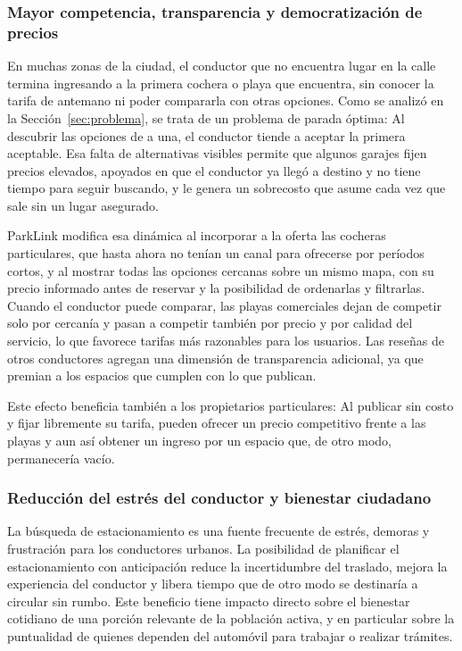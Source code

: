 \subsubsection{Mayor competencia, transparencia y democratización de precios}

En muchas zonas de la ciudad, el conductor que no encuentra lugar en la calle termina ingresando a la primera cochera o playa que encuentra, sin conocer la tarifa de antemano ni poder compararla con otras opciones. Como se analizó en la Sección~\ref{sec:problema}, se trata de un problema de parada óptima: Al descubrir las opciones de a una, el conductor tiende a aceptar la primera aceptable. Esa falta de alternativas visibles permite que algunos garajes fijen precios elevados, apoyados en que el conductor ya llegó a destino y no tiene tiempo para seguir buscando, y le genera un sobrecosto que asume cada vez que sale sin un lugar asegurado.

ParkLink modifica esa dinámica al incorporar a la oferta las cocheras particulares, que hasta ahora no tenían un canal para ofrecerse por períodos cortos, y al mostrar todas las opciones cercanas sobre un mismo mapa, con su precio informado antes de reservar y la posibilidad de ordenarlas y filtrarlas. Cuando el conductor puede comparar, las playas comerciales dejan de competir solo por cercanía y pasan a competir también por precio y por calidad del servicio, lo que favorece tarifas más razonables para los usuarios. Las reseñas de otros conductores agregan una dimensión de transparencia adicional, ya que premian a los espacios que cumplen con lo que publican.

Este efecto beneficia también a los propietarios particulares: Al publicar sin costo y fijar libremente su tarifa, pueden ofrecer un precio competitivo frente a las playas y aun así obtener un ingreso por un espacio que, de otro modo, permanecería vacío.

\subsubsection{Reducción del estrés del conductor y bienestar ciudadano}

La búsqueda de estacionamiento es una fuente frecuente de estrés, demoras y frustración para los conductores urbanos. La posibilidad de planificar el estacionamiento con anticipación reduce la incertidumbre del traslado, mejora la experiencia del conductor y libera tiempo que de otro modo se destinaría a circular sin rumbo. Este beneficio tiene impacto directo sobre el bienestar cotidiano de una porción relevante de la población activa, y en particular sobre la puntualidad de quienes dependen del automóvil para trabajar o realizar trámites.


